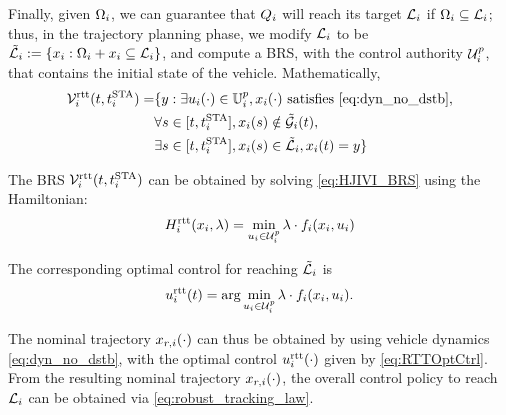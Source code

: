 Finally, given $\Omega_i$, we can guarantee that $Q_i$ will reach its target $\mathcal{L}_i$ if $\Omega_i \subseteq \mathcal{L}_i$; thus, in the trajectory planning phase, we modify $\mathcal{L}_i$ to be $\tilde{\mathcal{L}}_i := \{x_i: \Omega_i + x_i \subseteq \mathcal{L}_i\}$, and compute a BRS, with the control authority $\mathcal{U}^p_i$, that contains the initial state of the vehicle. Mathematically,
\vspace{-0.1cm}
\begin{equation}
\label{eq:rttBRS}
\begin{aligned}
\brs_i^\text{rtt}(t, \sta_i) = & \{y: \exists \ctrl_i(\cdot) \in \cfset^p_i, \state_i(\cdot) \text{ satisfies \eqref{eq:dyn_no_dstb}},\\
&\forall s \in [t, \sta_i], \state_i(s) \notin \tilde{\obsset}_i(t), \\
& \exists s \in [t, \sta_i], \state_i(s) \in \tilde{\targetset}_i, \state_i(t) = y\}
\end{aligned}
\end{equation}

The BRS $\mathcal{V}_i^\text{rtt}(t, t^\text{STA}_i)$ can be obtained by solving \eqref{eq:HJIVI_BRS} using the Hamiltonian: 
\begin{equation}
\label{eq:RTTham}
\ham_i^\text{rtt}(\state_i, \costate) = \min_{\ctrl_i \in \cset^\pos_i } \costate \cdot \fdyn_i(\state_i, \ctrl_i)
\end{equation}

The corresponding optimal control for reaching $\tilde{\mathcal{L}}_i$ is
\begin{equation}
\label{eq:RTTOptCtrl}
\ctrl_i^\text{rtt}(t) = \arg \min_{\ctrl_i \in \cset^\pos_i } \costate \cdot \fdyn_i(\state_i, \ctrl_i).
\end{equation}

The nominal trajectory $x_{r,i}(\cdot)$ can thus be obtained by using vehicle dynamics \eqref{eq:dyn_no_dstb}, with the optimal control  $u_i^\text{rtt}(\cdot)$ given by \eqref{eq:RTTOptCtrl}. From the resulting nominal trajectory $x_{r,i}(\cdot)$, the overall control policy to reach $\mathcal{L}_i$ can be obtained via \eqref{eq:robust_tracking_law}. 


